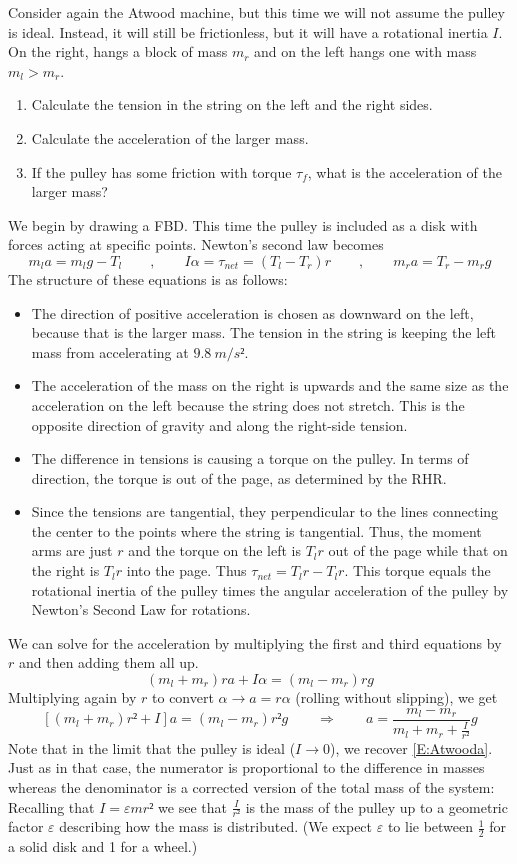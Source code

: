 \begin{example}
Consider again the Atwood machine, but this time we will not assume the pulley is ideal. Instead, it will still be frictionless, but it will have a rotational inertia $I$. On the right, hangs a block of mass $m_r$ and on the left hangs one with mass $m_l>m_r$. 
\begin{enumerate}
	\item Calculate the tension in the string on the left and the right sides. 
	\item Calculate the acceleration of the larger mass. 
	\item If the pulley has some friction with torque $τ_f$, what is the acceleration of the larger mass?
\end{enumerate}
\begin{solution}
We begin by drawing a FBD. This time the pulley is included as a disk with forces acting at specific points. 
Newton's second law becomes
$$
m_l a = m_l g - T_l 
\quad \quad,\quad \quad
I α = τ_{net} = (T_l -T_r)r 
\quad \quad,\quad \quad
m_r a = T_r - m_r g 
$$
The structure of these equations is as follows:
\begin{itemize}
\item The direction of positive acceleration is chosen as downward on the left, because that is the larger mass. The tension in the string is keeping the left mass from accelerating at $9.8\ m/s²$. 
\item The acceleration of the mass on the right is upwards and the same size as the acceleration on the left because the string does not stretch. This is the opposite direction of gravity and along the right-side tension. 
\item The difference in tensions is causing a torque on the pulley. In terms of direction, the torque is out of the page, as determined by the RHR. 
\item Since the tensions are tangential, they perpendicular to the lines connecting the center to the points where the string is tangential. Thus, the moment arms are just $r$ and the torque on the left is $T_l r$ out of the page while that on the right is $T_l r$ into the page. Thus $τ_{net} = T_l r - T_l r$. This torque equals the rotational inertia of the pulley times the angular acceleration of the pulley by Newton's Second Law for rotations. 
\end{itemize}
We can solve for the acceleration by multiplying the first and third equations by $r$ and then adding them all up. 
$$
(m_l +m_r) ra + Iα = (m_l -m_r)rg
$$
Multiplying again by $r$ to convert $α → a = rα$ (rolling without slipping), we get
$$
[(m_l +m_r) r² +I ]a  = (m_l -m_r)r² g
\quad \quad ⇒ \quad \quad
a  =\frac {m_l -m_r}{m_l +m_r  + \frac I{r²} } g
$$
Note that in the limit that the pulley is ideal ($I→ 0$), we recover \eqref{E:Atwooda}. Just as in that case, the numerator is proportional to the difference in masses whereas the denominator is a corrected version of the total mass of the system: Recalling that $I=ε mr²$ we see that $\frac I{r²}$ is the mass of the pulley up to a geometric factor $ε$ describing how the mass is distributed. (We expect $ε$ to lie between $\frac12$ for a solid disk and 1 for a wheel.)


\end{solution}
\end{example}
